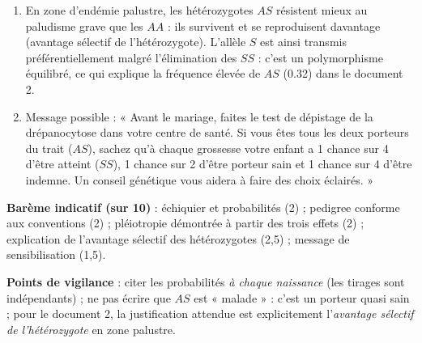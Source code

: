 \documentclass[11pt]{article}
\newcommand{\cle}[1]{{\popxbold\color{popdark}#1}}
\begin{document}
\begin{corrige}
\begin{enumerate}
\item En zone d'endémie palustre, les hétérozygotes $AS$ résistent mieux au paludisme grave que les $AA$ : ils survivent et se reproduisent davantage (\cle{avantage sélectif de l'hétérozygote}). L'allèle $S$ est ainsi transmis préférentiellement malgré l'élimination des $SS$ : c'est un \cle{polymorphisme équilibré}, ce qui explique la fréquence élevée de $AS$ (\num{0,32}) dans le document 2.
\item Message possible : « Avant le mariage, faites le test de dépistage de la drépanocytose dans votre centre de santé. Si vous êtes tous les deux porteurs du trait ($AS$), sachez qu'à chaque grossesse votre enfant a 1 chance sur 4 d'être atteint ($SS$), 1 chance sur 2 d'être porteur sain et 1 chance sur 4 d'être indemne. Un conseil génétique vous aidera à faire des choix éclairés. »
\end{enumerate}
\textbf{Barème indicatif (sur 10)} : échiquier et probabilités (2) ; pedigree conforme aux conventions (2) ; pléiotropie démontrée à partir des trois effets (2) ; explication de l'avantage sélectif des hétérozygotes (2,5) ; message de sensibilisation (1,5).

\textbf{Points de vigilance} : citer les probabilités \emph{à chaque naissance} (les tirages sont indépendants) ; ne pas écrire que $AS$ est « malade » : c'est un porteur quasi sain ; pour le document 2, la justification attendue est explicitement l'\emph{avantage sélectif de l'hétérozygote} en zone palustre.
\end{corrige}
\end{document}
